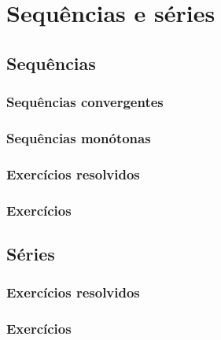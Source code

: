 
\chapter{Sequências e séries}\label{cap:seq_series}

\emconstrucao

\section{Sequências}
\subsection{Sequências convergentes}
\subsection{Sequências monótonas}
\construirSec
\subsection*{Exercícios resolvidos}

\construirExeresol


\subsection*{Exercícios}

\construirExer


\section{Séries}
\construirSec

\subsection*{Exercícios resolvidos}

\construirExeresol


\subsection*{Exercícios}

